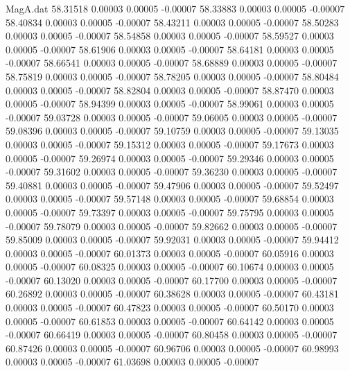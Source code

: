 \begin{filecontents}{MagA.dat}
  58.31518    0.00003    0.00005   -0.00007
  58.33883    0.00003    0.00005   -0.00007
  58.40834    0.00003    0.00005   -0.00007
  58.43211    0.00003    0.00005   -0.00007
  58.50283    0.00003    0.00005   -0.00007
  58.54858    0.00003    0.00005   -0.00007
  58.59527    0.00003    0.00005   -0.00007
  58.61906    0.00003    0.00005   -0.00007
  58.64181    0.00003    0.00005   -0.00007
  58.66541    0.00003    0.00005   -0.00007
  58.68889    0.00003    0.00005   -0.00007
  58.75819    0.00003    0.00005   -0.00007
  58.78205    0.00003    0.00005   -0.00007
  58.80484    0.00003    0.00005   -0.00007
  58.82804    0.00003    0.00005   -0.00007
  58.87470    0.00003    0.00005   -0.00007
  58.94399    0.00003    0.00005   -0.00007
  58.99061    0.00003    0.00005   -0.00007
  59.03728    0.00003    0.00005   -0.00007
  59.06005    0.00003    0.00005   -0.00007
  59.08396    0.00003    0.00005   -0.00007
  59.10759    0.00003    0.00005   -0.00007
  59.13035    0.00003    0.00005   -0.00007
  59.15312    0.00003    0.00005   -0.00007
  59.17673    0.00003    0.00005   -0.00007
  59.26974    0.00003    0.00005   -0.00007
  59.29346    0.00003    0.00005   -0.00007
  59.31602    0.00003    0.00005   -0.00007
  59.36230    0.00003    0.00005   -0.00007
  59.40881    0.00003    0.00005   -0.00007
  59.47906    0.00003    0.00005   -0.00007
  59.52497    0.00003    0.00005   -0.00007
  59.57148    0.00003    0.00005   -0.00007
  59.68854    0.00003    0.00005   -0.00007
  59.73397    0.00003    0.00005   -0.00007
  59.75795    0.00003    0.00005   -0.00007
  59.78079    0.00003    0.00005   -0.00007
  59.82662    0.00003    0.00005   -0.00007
  59.85009    0.00003    0.00005   -0.00007
  59.92031    0.00003    0.00005   -0.00007
  59.94412    0.00003    0.00005   -0.00007
  60.01373    0.00003    0.00005   -0.00007
  60.05916    0.00003    0.00005   -0.00007
  60.08325    0.00003    0.00005   -0.00007
  60.10674    0.00003    0.00005   -0.00007
  60.13020    0.00003    0.00005   -0.00007
  60.17700    0.00003    0.00005   -0.00007
  60.26892    0.00003    0.00005   -0.00007
  60.38628    0.00003    0.00005   -0.00007
  60.43181    0.00003    0.00005   -0.00007
  60.47823    0.00003    0.00005   -0.00007
  60.50170    0.00003    0.00005   -0.00007
  60.61853    0.00003    0.00005   -0.00007
  60.64142    0.00003    0.00005   -0.00007
  60.66419    0.00003    0.00005   -0.00007
  60.80458    0.00003    0.00005   -0.00007
  60.87426    0.00003    0.00005   -0.00007
  60.96706    0.00003    0.00005   -0.00007
  60.98993    0.00003    0.00005   -0.00007
  61.03698    0.00003    0.00005   -0.00007

\end{filecontents}
